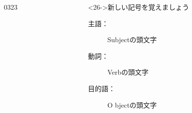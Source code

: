 \documentclass[aspectratio=169,xcolor={dvipsnames,table}]{beamer}
\begin{document}
\begin{frame}[plain]
\begin{columns}[t]
\begin{column}{.55\textwidth}
\begin{alertblock}
\begin{itemize}
\end{itemize}
 \end{alertblock}
%
\vspace*{-5pt}
{\tiny 0323}\,{\scriptsize {}}

\end{column} 
\begin{column}{.44\textwidth}
 \begin{block}<26->{新しい記号を覚えましょう}\small
       \begin{description}
	\item[主語：] S\hfill{ubjectの頭文字} 
	\item[動詞：] V\hfill{erbの頭文字}
	\item[目的語：] O \hfill{bjectの頭文字}
       \end{description}
      \end{block}
\end{column} 
\end{columns}

\end{frame}
\end{document}
